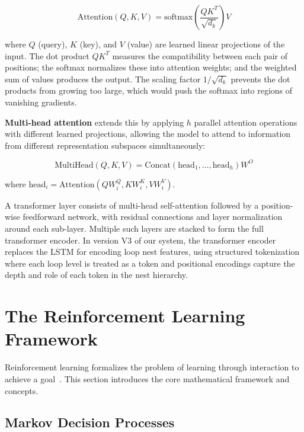 \begin{equation}
    \text{Attention}(Q, K, V) = \text{softmax}\!\left(\frac{QK^T}{\sqrt{d_k}}\right) V
\end{equation}

where $Q$ (query), $K$ (key), and $V$ (value) are learned linear projections of the input. The dot product $QK^T$ measures the compatibility between each pair of positions; the softmax normalizes these into attention weights; and the weighted sum of values produces the output. The scaling factor $1/\sqrt{d_k}$ prevents the dot products from growing too large, which would push the softmax into regions of vanishing gradients.

\textbf{Multi-head attention} extends this by applying $h$ parallel attention operations with different learned projections, allowing the model to attend to information from different representation subspaces simultaneously:

\begin{equation}
    \text{MultiHead}(Q, K, V) = \text{Concat}(\text{head}_1, \ldots, \text{head}_h) W^O
\end{equation}

where $\text{head}_i = \text{Attention}(QW_i^Q, KW_i^K, VW_i^V)$.

A transformer layer consists of multi-head self-attention followed by a position-wise feedforward network, with residual connections and layer normalization around each sub-layer. Multiple such layers are stacked to form the full transformer encoder. In version V3 of our system, the transformer encoder replaces the LSTM for encoding loop nest features, using structured tokenization where each loop level is treated as a token and positional encodings capture the depth and role of each token in the nest hierarchy.

\section{The Reinforcement Learning Framework}

Reinforcement learning formalizes the problem of learning through interaction to achieve a goal~\cite{sutton2018reinforcement}. This section introduces the core mathematical framework and concepts.

\subsection{Markov Decision Processes}

